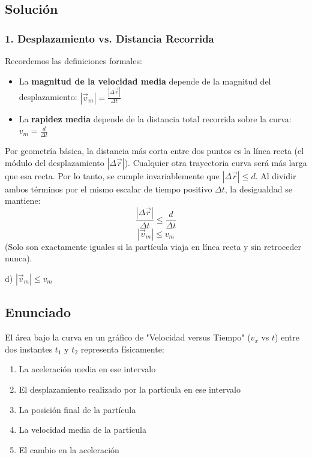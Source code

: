 \documentclass[12pt, a4paper]{article}
\begin{document}
\subsection*{Solución}

\subsubsection*{1. Desplazamiento vs. Distancia Recorrida}
Recordemos las definiciones formales:
\begin{itemize}
    \item La \textbf{magnitud de la velocidad media} depende de la magnitud del desplazamiento: $|\vec{v}_m| = \frac{|\Delta \vec{r}|}{\Delta t}$
    \item La \textbf{rapidez media} depende de la distancia total recorrida sobre la curva: $v_m = \frac{d}{\Delta t}$
\end{itemize}

Por geometría básica, la distancia más corta entre dos puntos es la línea recta (el módulo del desplazamiento $|\Delta \vec{r}|$). Cualquier otra trayectoria curva será más larga que esa recta. Por lo tanto, se cumple invariablemente que $|\Delta \vec{r}| \le d$. 
Al dividir ambos términos por el mismo escalar de tiempo positivo $\Delta t$, la desigualdad se mantiene:
$$ \frac{|\Delta \vec{r}|}{\Delta t} \le \frac{d}{\Delta t} $$
$$ |\vec{v}_m| \le v_m $$
(Solo son exactamente iguales si la partícula viaja en línea recta y sin retroceder nunca).

\begin{tcolorbox}[colback=green!5!white, colframe=green!50!black, title=Respuesta Final]
\centering \Large d) $|\vec{v}_m| \le v_m$
\end{tcolorbox}

\newpage

\subsection*{Enunciado}
El área bajo la curva en un gráfico de "Velocidad versus Tiempo" ($v_x$ vs $t$) entre dos instantes $t_1$ y $t_2$ representa físicamente:
\begin{enumerate}[label=\alph*)]
    \item La aceleración media en ese intervalo
    \item El desplazamiento realizado por la partícula en ese intervalo
    \item La posición final de la partícula
    \item La velocidad media de la partícula
    \item El cambio en la aceleración
\end{enumerate}
\end{document}
